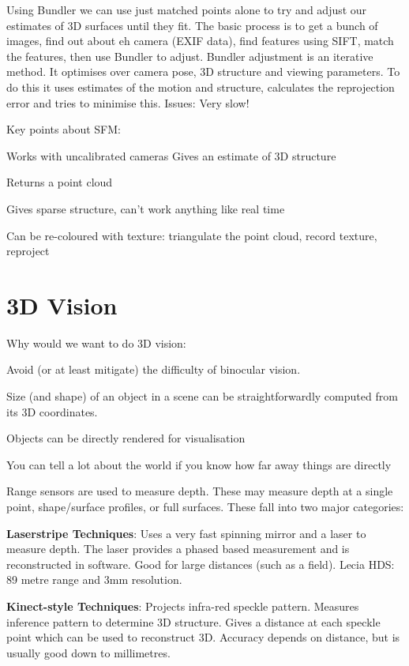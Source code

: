 \documentclass[8pt]{extarticle}
\begin{document}
\begin{multicols}{2}
Using Bundler we can use just matched points alone to try and adjust our estimates of 3D surfaces until they fit. The basic process is to get a bunch of images, find out about eh camera (EXIF data), find features using SIFT, match the features, then use Bundler to adjust. Bundler adjustment is an iterative method. It optimises over camera pose, 3D structure and viewing parameters. To do this it uses estimates of the motion and structure, calculates the reprojection error and tries to minimise this. Issues: Very slow!

Key points about SFM:
\begin{compactitem}
    \item Works with uncalibrated cameras Gives an estimate of 3D structure
    \item Returns a point cloud
    \item Gives sparse structure, can’t work anything like real time
    \item Can be re-coloured with texture: triangulate the point cloud, record texture, reproject
\end{compactitem}

\section{3D Vision}
Why would we want to do 3D vision:
\begin{compactitem}
    \item Avoid (or at least mitigate) the difficulty of binocular vision.
    \item Size (and shape) of an object in a scene can be straightforwardly computed from its 3D coordinates.
    \item Objects can be directly rendered for visualisation
    \item You can tell a lot about the world if you know how far away things are directly
\end{compactitem}

Range sensors are used to measure depth. These may measure depth at a single point, shape/surface profiles, or full surfaces. These fall into two major categories:

\textbf{Laserstripe Techniques}: Uses a very fast spinning mirror and a laser to measure depth. The laser provides a phased based measurement and is reconstructed in software. Good for large distances (such as a field). Lecia HDS: 89 metre range and 3mm resolution.

\textbf{Kinect-style Techniques}: Projects infra-red speckle pattern. Measures inference pattern to determine 3D structure. Gives a distance at each speckle point which can be used to reconstruct 3D. Accuracy depends on distance, but is usually good down to millimetres.


\end{multicols}
\end{document}
